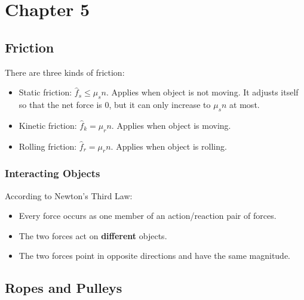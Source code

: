 \section*{Chapter 5}

\subsection*{Friction}

There are three kinds of friction:

\begin{itemize}
    \item Static friction: $\hat{f}_s \leq \mu_s n$. Applies when object is not moving. It adjusts itself so that the net force is 0, but it can only increase to $\mu_s n$ at most.
    \item Kinetic friction: $\hat{f}_k = \mu_r n$. Applies when object is moving.
    \item Rolling friction: $\hat{f}_r = \mu_r n$. Applies when object is rolling.
\end{itemize}

\subsubsection*{Interacting Objects}

According to Newton's Third Law:

\begin{itemize}
    \item Every force occurs as one member of an action/reaction pair of forces.
    \item The two forces act on \textbf{different} objects.
    \item The two forces point in opposite directions and have the same magnitude.
\end{itemize}

\subsection{Ropes and Pulleys}


